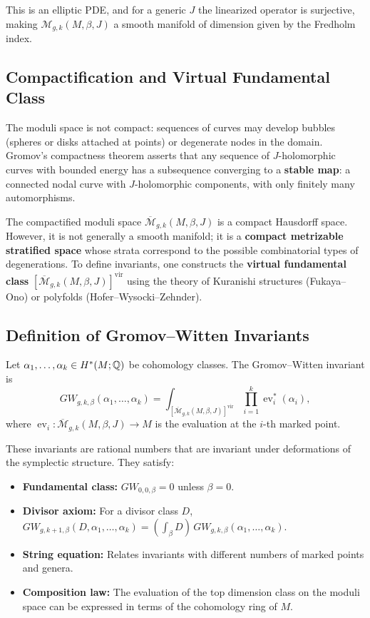 This is an elliptic PDE, and for a generic \(J\) the linearized operator is surjective, making \(\mathcal{M}_{g, k}(M, \beta, J)\) a smooth manifold of dimension given by the Fredholm index.

\subsection{Compactification and Virtual Fundamental Class}

The moduli space is not compact: sequences of curves may develop bubbles (spheres or disks attached at points) or degenerate nodes in the domain. Gromov's compactness theorem asserts that any sequence of \(J\)-holomorphic curves with bounded energy has a subsequence converging to a \textbf{stable map}: a connected nodal curve with \(J\)-holomorphic components, with only finitely many automorphisms.

The compactified moduli space \(\overline{\mathcal{M}}_{g, k}(M, \beta, J)\) is a compact Hausdorff space. However, it is not generally a smooth manifold; it is a \textbf{compact metrizable stratified space} whose strata correspond to the possible combinatorial types of degenerations. To define invariants, one constructs the \textbf{virtual fundamental class} \([\overline{\mathcal{M}}_{g, k}(M, \beta, J)]^{\text{vir}}\) using the theory of Kuranishi structures (Fukaya--Ono) or polyfolds (Hofer--Wysocki--Zehnder).

\subsection{Definition of Gromov--Witten Invariants}

Let \(\alpha_1, \dots, \alpha_k \in H^*(M; \mathbb{Q})\) be cohomology classes. The Gromov--Witten invariant is
\[
GW_{g, k, \beta}(\alpha_1, \dots, \alpha_k) = \int_{[\overline{\mathcal{M}}_{g, k}(M, \beta, J)]^{\text{vir}}} \prod_{i=1}^k \operatorname{ev}_i^*(\alpha_i),
\]
where \(\operatorname{ev}_i: \overline{\mathcal{M}}_{g, k}(M, \beta, J) \to M\) is the evaluation at the \(i\)-th marked point.

These invariants are rational numbers that are invariant under deformations of the symplectic structure. They satisfy:
\begin{itemize}
    \item \textbf{Fundamental class:} \(GW_{0, 0, \beta} = 0\) unless \(\beta = 0\).
    \item \textbf{Divisor axiom:} For a divisor class \(D\), \(GW_{g, k+1, \beta}(D, \alpha_1, \dots, \alpha_k) = (\int_\beta D) \, GW_{g, k, \beta}(\alpha_1, \dots, \alpha_k)\).
    \item \textbf{String equation:} Relates invariants with different numbers of marked points and genera.
    \item \textbf{Composition law:} The evaluation of the top dimension class on the moduli space can be expressed in terms of the cohomology ring of \(M\).
\end{itemize}

